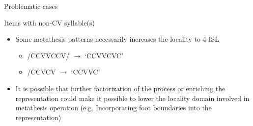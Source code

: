 \documentclass[professionalfonts, xcolor={usenames,svgnames,x11names,table}]{beamer}
\begin{document}
    \appendix
	
	\begin{frame}{Problematic cases}
		\begin{alertblock}{Items with non-CV syllable(s)}
			\begin{itemize}
				\item Some metathesis patterns necessarily increases the locality to 4-ISL
				 \begin{itemize}
				 	\item  /C\highlight{V}CVVCCV/ $\rightarrow$ `C\highlight{V}CVVCVC' 
				 	\item /CCVCV $\rightarrow$ `C\highlight{V}CVVC'
				 \end{itemize} 
				\item It is possible that further factorization of the process or enriching the representation could make it possible to lower the locality domain involved in metathesis operation (e.g. Incorporating foot boundaries into the representation) 
			\end{itemize}
		\end{alertblock}
	\end{frame}
	
\end{document}
